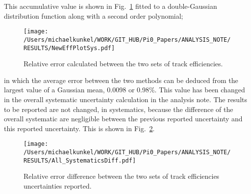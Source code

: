\documentclass[10pt,a4paper]{report}
\newlength{\figwidth}
\newlength{\hfigheight}
\begin{document}
This accumulative value is shown in Fig.~\ref{fig:toteff_error} fitted to a double-Gaussian distribution function along with a second order polynomial;
\begin{figure}[h!]\begin{center}
		\texttt{[image: /Users/michaelkunkel/WORK/GIT\_HUB/Pi0\_Papers/ANALYSIS\_NOTE/RESULTS/NewEffPlotSys.pdf]}
		\caption{Relative error calculated between the two sets of track efficiencies.}\label{fig:toteff_error}
\end{center}\end{figure}
in which the average error between the two methods can be deduced from the largest value of a Gaussian mean, 0.0098 or 0.98\%.		
This value has been changed in the overall systematic uncertainty calculation in the analysis note. The results to be reported are not changed, in systematics, because the difference of the overall systematic are negligible between the previous reported uncertainty and this reported uncertainty. This is shown in Fig.~\ref{fig:toteff_DIFF}.
\begin{figure}[h!]\begin{center}
		\texttt{[image: /Users/michaelkunkel/WORK/GIT\_HUB/Pi0\_Papers/ANALYSIS\_NOTE/RESULTS/All\_SystematicsDiff.pdf]}
		\caption{Relative error difference between the two sets of track efficiencies uncertainties reported.}\label{fig:toteff_DIFF}
\end{center}\end{figure}
\end{document}
